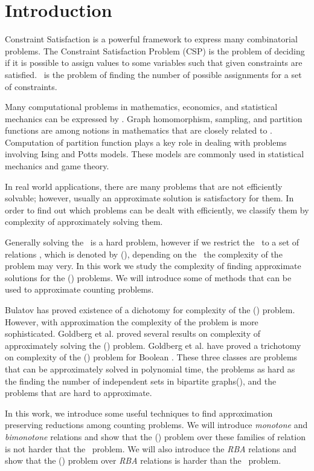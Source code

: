 \chapter{Introduction}
Constraint Satisfaction is a powerful framework to express many combinatorial problems.
The Constraint Satisfaction Problem (CSP) is the problem of deciding if it is possible to
assign values to some variables such that given constraints are satisfied. \ccsp\ 
is the problem of finding the number of possible assignments for a set of constraints.

Many computational problems in mathematics, economics, and statistical mechanics
can be expressed by \ccsp\@. Graph homomorphism, sampling,
and partition functions are among notions in mathematics
that are closely related to \ccsp\@. Computation of partition function plays a key role
in dealing with problems involving Ising and Potts models. These models are
commonly used in statistical mechanics and game theory.
 
In real world applications, there are many problems that are not efficiently solvable;
however, usually an approximate solution is satisfactory for them. 
In order to find out which problems can be dealt with efficiently, we classify them
by complexity of approximately solving them.

Generally solving the \ccsp\ is a hard problem, however if we restrict the
\ccsp\ to a set of relations \mrelset, which is denoted by \ccsp(\mrelset),
depending on the \mrelset\ the complexity of the problem may very.
In this work we study the complexity of finding approximate solutions for the \ccsp(\mrelset) problems.
We will introduce some of methods that can be used to approximate counting problems.

Bulatov \cite{Bulatov} has proved existence of a dichotomy for complexity of the
\ccsp(\mrelset) problem. However, with approximation the complexity of the problem is
more sophisticated. Goldberg et al. \cite{Leslie03} proved
several results on complexity of approximately solving the \ccsp(\mrelset) problem.
Goldberg et al. \cite{Trichotomy} have proved a trichotomy on complexity
of the \ccsp(\mrelset) problem for Boolean \mrelset\@. These three classes are
problems that can be approximately solved in polynomial time, the problems as hard as the 
finding the number of independent sets in bipartite graphs(\cbis), and the
problems that are hard to approximate.

In this work, we introduce some useful techniques to find approximation preserving reductions
among counting problems. We will introduce \emph{monotone} and \emph{bimonotone} relations
and show that the \ccsp(\mrelset) problem over these families of relation is not harder that
the \cbis\ problem. We will also introduce the \emph{RBA} relations and
show that the \ccsp(\mrelset) problem over \emph{RBA} relations is harder than the \cbis\ problem.

